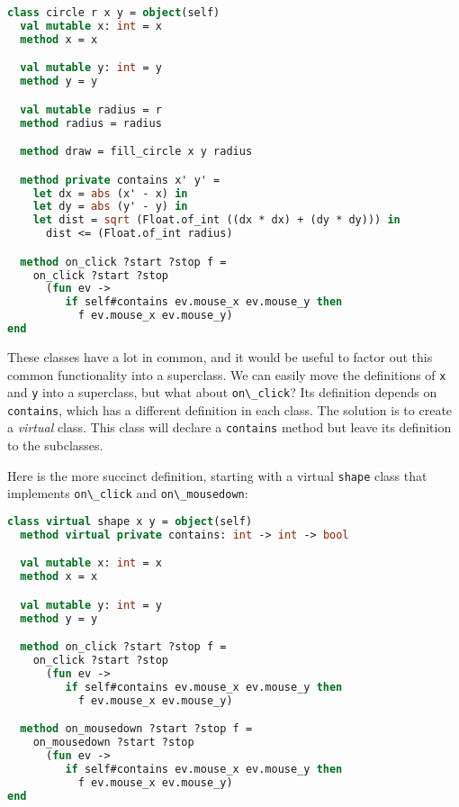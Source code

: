 \begin{lstlisting}[language=Caml]
class circle r x y = object(self)
  val mutable x: int = x
  method x = x

  val mutable y: int = y
  method y = y

  val mutable radius = r
  method radius = radius

  method draw = fill_circle x y radius

  method private contains x' y' =
    let dx = abs (x' - x) in
    let dy = abs (y' - y) in
    let dist = sqrt (Float.of_int ((dx * dx) + (dy * dy))) in
      dist <= (Float.of_int radius)

  method on_click ?start ?stop f =
    on_click ?start ?stop
      (fun ev ->
         if self#contains ev.mouse_x ev.mouse_y then
           f ev.mouse_x ev.mouse_y)
end
\end{lstlisting}

These classes have a lot in common, and it would be useful to factor out
this common functionality into a superclass. We can easily move the
definitions of \passthrough{\lstinline!x!} and
\passthrough{\lstinline!y!} into a superclass, but what about
\passthrough{\lstinline!on\_click!}? Its definition depends on
\passthrough{\lstinline!contains!}, which has a different definition in
each class. The solution is to create a \emph{virtual} class. This class
will declare a \passthrough{\lstinline!contains!} method but leave its
definition to the subclasses.

Here is the more succinct definition, starting with a virtual
\passthrough{\lstinline!shape!} class that implements
\passthrough{\lstinline!on\_click!} and
\passthrough{\lstinline!on\_mousedown!}:

\begin{lstlisting}[language=Caml]
class virtual shape x y = object(self)
  method virtual private contains: int -> int -> bool

  val mutable x: int = x
  method x = x

  val mutable y: int = y
  method y = y

  method on_click ?start ?stop f =
    on_click ?start ?stop
      (fun ev ->
         if self#contains ev.mouse_x ev.mouse_y then
           f ev.mouse_x ev.mouse_y)

  method on_mousedown ?start ?stop f =
    on_mousedown ?start ?stop
      (fun ev ->
         if self#contains ev.mouse_x ev.mouse_y then
           f ev.mouse_x ev.mouse_y)
end
\end{lstlisting}

